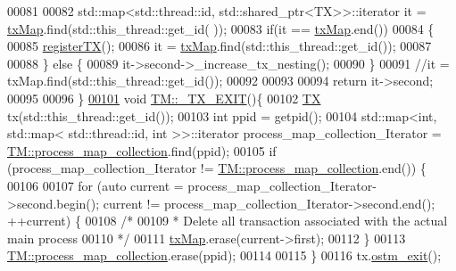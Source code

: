 \begin{DoxyCode}
00081 
00082     std::map<std::thread::id, std::shared\_ptr<TX>>::iterator it = \hyperlink{class_t_m_a0333dfa193ea99d7626de74a2b932e9b_a0333dfa193ea99d7626de74a2b932e9b}{txMap}.find(std::this\_thread::get\_id(
      ));
00083     \textcolor{keywordflow}{if}(it == \hyperlink{class_t_m_a0333dfa193ea99d7626de74a2b932e9b_a0333dfa193ea99d7626de74a2b932e9b}{txMap}.end())
00084     \{
00085        \hyperlink{class_t_m_a26ea481c24d9aa3aebd6dafb7253376e_a26ea481c24d9aa3aebd6dafb7253376e}{registerTX}();
00086        it = \hyperlink{class_t_m_a0333dfa193ea99d7626de74a2b932e9b_a0333dfa193ea99d7626de74a2b932e9b}{txMap}.find(std::this\_thread::get\_id());
00087        
00088     \} \textcolor{keywordflow}{else} \{
00089         it->second->\_increase\_tx\_nesting();
00090     \}
00091     \textcolor{comment}{//it = txMap.find(std::this\_thread::get\_id());}
00092     
00093 
00094     \textcolor{keywordflow}{return} it->second;
00095 
00096 \}
\hypertarget{_t_m_8cpp_source.tex_l00101}{}\hyperlink{class_t_m_a5e2d1127f2429f2f524d25f430eade06_a5e2d1127f2429f2f524d25f430eade06}{00101} \textcolor{keywordtype}{void} \hyperlink{class_t_m_a5e2d1127f2429f2f524d25f430eade06_a5e2d1127f2429f2f524d25f430eade06}{TM::\_TX\_EXIT}()\{
00102     \hyperlink{class_t_x}{TX} tx(std::this\_thread::get\_id());
00103     \textcolor{keywordtype}{int} ppid = getpid();
00104     std::map<int, std::map< std::thread::id, int >>::iterator process\_map\_collection\_Iterator = 
      \hyperlink{class_t_m_a81c3bd28ad2343a620fa070f8ac186ca_a81c3bd28ad2343a620fa070f8ac186ca}{TM::process\_map\_collection}.find(ppid);
00105     \textcolor{keywordflow}{if} (process\_map\_collection\_Iterator != \hyperlink{class_t_m_a81c3bd28ad2343a620fa070f8ac186ca_a81c3bd28ad2343a620fa070f8ac186ca}{TM::process\_map\_collection}.end()) \{
00106 
00107         \textcolor{keywordflow}{for} (\textcolor{keyword}{auto} current = process\_map\_collection\_Iterator->second.begin(); current != 
      process\_map\_collection\_Iterator->second.end(); ++current) \{
00108             \textcolor{comment}{/*}
00109 \textcolor{comment}{             * Delete all transaction associated with the actual main process}
00110 \textcolor{comment}{             */}
00111             \hyperlink{class_t_m_a0333dfa193ea99d7626de74a2b932e9b_a0333dfa193ea99d7626de74a2b932e9b}{txMap}.erase(current->first);
00112         \}
00113         \hyperlink{class_t_m_a81c3bd28ad2343a620fa070f8ac186ca_a81c3bd28ad2343a620fa070f8ac186ca}{TM::process\_map\_collection}.erase(ppid);
00114 
00115     \}
00116     tx.\hyperlink{class_t_x_aa9739c5c2077454c779098db7baefc2b_aa9739c5c2077454c779098db7baefc2b}{ostm\_exit}();

\end{DoxyCode}
